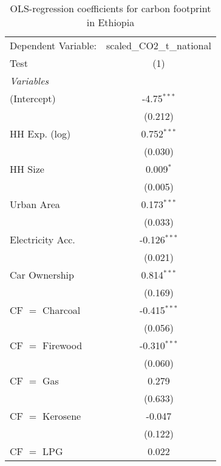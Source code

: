 
\begin{table}[htbp!]
   \centering
   \small
   \begin{adjustbox}{width = 1\textwidth, max height = 0.95\textheight, center}
      \begin{threeparttable}[b]
         \caption{\label{tab:OLS_2_ETH} OLS-regression coefficients for carbon footprint in Ethiopia}
         \begin{tabular}{lc}
            \tabularnewline \midrule \midrule
            Dependent Variable: & scaled\_CO2\_t\_national\\     
            Test                & (1)\\  
            \midrule
            \emph{Variables}\\
            (Intercept)         & -4.75$^{***}$\\   
                                & (0.212)\\   
            HH Exp. (log)       & 0.752$^{***}$\\   
                                & (0.030)\\   
            HH Size             & 0.009$^{*}$\\   
                                & (0.005)\\   
            Urban Area          & 0.173$^{***}$\\   
                                & (0.033)\\   
            Electricity Acc.    & -0.126$^{***}$\\   
                                & (0.021)\\   
            Car Ownership       & 0.814$^{***}$\\   
                                & (0.169)\\   
            CF $=$ Charcoal     & -0.415$^{***}$\\   
                                & (0.056)\\   
            CF $=$ Firewood     & -0.310$^{***}$\\   
                                & (0.060)\\   
            CF $=$ Gas          & 0.279\\   
                                & (0.633)\\   
            CF $=$ Kerosene     & -0.047\\   
                                & (0.122)\\   
            CF $=$ LPG          & 0.022\\   

\end{tabular}
\end{threeparttable}
\end{adjustbox}
\end{table}
